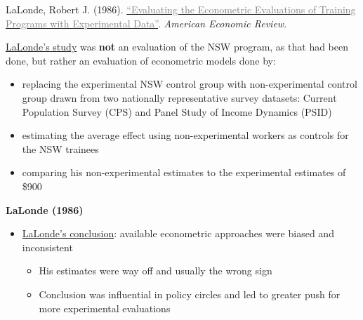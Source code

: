 \documentclass[notes=show]{beamer}
\newcommand{\myurlshort}[2]{\href{#1}{\textcolor{gray}{\textsf{#2}}}}
\begin{document}
\begin{frame}[plain]
	\begin{center}
	LaLonde, Robert J. (1986). \myurlshort{http://business.baylor.edu/scott_cunningham/teaching/lalonde-1986.pdf}{``Evaluating the Econometric Evaluations of Training Programs with Experimental Data''}. \emph{American Economic Review}. 
	\end{center}
	
\underline{LaLonde's study} was \textbf{not} an evaluation of the NSW program, as that had been done, but rather an evaluation of econometric models done by:
		\begin{itemize}
		\item replacing the experimental NSW control group with non-experimental control group drawn from two nationally representative survey datasets: Current Population Survey (CPS) and Panel Study of Income Dynamics (PSID)
		\item estimating the average effect using non-experimental workers as controls for the NSW trainees 
		\item comparing his non-experimental estimates to the experimental estimates of \$900
		\end{itemize}
\end{frame}

\begin{frame}[plain]
\begin{center}
\textbf{LaLonde (1986)}
\end{center}

\begin{itemize}

	\item \underline{LaLonde's conclusion}: available econometric approaches were biased and inconsistent
		\begin{itemize}
		\item His estimates were way off and usually the wrong sign
		\item Conclusion was influential in policy circles and led to greater push for more experimental evaluations
		\end{itemize}

\end{itemize}

\end{frame}
\end{document}
